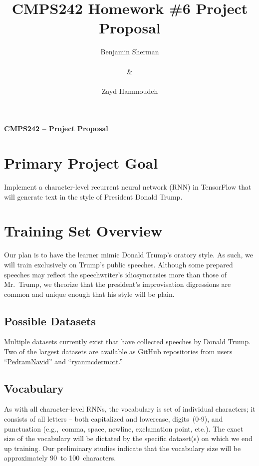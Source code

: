 \documentclass{report}
\title{\textbf{CMPS242 Homework \#6 \textendash{} Project Proposal}}
\author{Benjamin Sherman \\~\\ \& \\~\\ Zayd Hammoudeh}
\date{} %
\begin{document}
  \maketitle
  
  \begin{center}
    {\Large \textbf{CMPS242 -- Project Proposal}} \\[.125in]
  \end{center}
  
  \suppressfloats %
  \section{Primary Project Goal}
  
  Implement a character-level recurrent neural network (RNN) in TensorFlow  that will generate text in the style of President Donald Trump.
  
  \section{Training Set Overview}
  
  Our plan is to have the learner mimic Donald Trump's oratory style.  As such, we will train exclusively on Trump's public speeches. Although some prepared speeches may reflect the speechwriter's idiosyncrasies more than those of Mr.~Trump, we theorize that the president's improvisation digressions are common and unique enough that his style will be plain.
  
  \subsection{Possible Datasets}
  
  Multiple datasets currently exist that have collected speeches by Donald Trump.  Two of the largest datasets are available as GitHub repositories from users ``\href{https://github.com/PedramNavid/trump_speeches}{PedramNavid}'' and ``\href{https://github.com/ryanmcdermott/trump-speeches}{ryanmcdermott}.''
  
  \subsection{Vocabulary}\label{sec:vocabulary}
  
  As with all character-level RNNs, the vocabulary is set of individual characters; it consists of all letters -- both capitalized and lowercase, digits~(0-9), and punctuation (e.g.,~comma, space, newline, exclamation point, etc.).  The exact size of the vocabulary will be dictated by the specific dataset(s) on which we end up training.  Our preliminary studies indicate that the vocabulary size will be approximately 90~to 100~characters.
   
\end{document}
